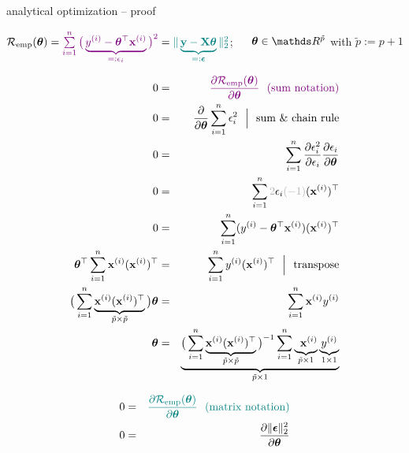 \documentclass[11pt,compress,t,notes=noshow, xcolor=table]{beamer}
\begin{document}
\begin{vbframe}{analytical optimization -- proof}

\scriptsize
$\mathcal{R}_{\text{emp}}(\bm{\theta}) = \textcolor{violet}{\sum\limits_{i=1}^n \big(\underbrace{y^{(i)} - \bm{\theta}^\top \mathbf{x}^{(i)}}_{=:
\epsilon_i} \big)^2}
= \textcolor{teal}{\| \underbrace{\mathbf{y} - \mathbf{X} \bm{\theta}}_{=: \bm{\epsilon}} 
\|^2_2}$; ~~ $\thetab \in \R^{\tilde p}$ with $\tilde p := p + 1$


\begin{minipage}[t]{0.52\textwidth}
    \tiny 
    \begin{eqnarray*}
        0 &=& \textcolor{violet}{\frac{\partial \risket}{\partial \thetab}
        ~~ \text{(sum notation)}} \\
        0 &=& \frac{\partial}{\partial \thetab} \sumin \epsilon_i^2 
        ~~ \Big \rvert
        ~~ \text{sum \& chain rule} \\
        0 &=& \sumin \frac{\partial \epsilon_i^2}{\partial \epsilon_i}
        \frac{\partial \epsilon_i}{\partial \thetab} \\
        0 &=& \sumin \textcolor{black!30}{2} \epsilon_i 
        \textcolor{black!30}{(-1)} (\xi)^\top \\ 
        0 &=& \sumin (\yi - \thetab^\top \xi)(\xi)^\top \\
        \thetab^\top \sumin  \xi (\xi)^\top &=&\sumin \yi (\xi)^\top 
        ~~ \Big \rvert ~~ \text{transpose} \\
        \big( \sumin \underbrace{\xi (\xi)^\top }_{\tilde p \times \tilde p}\big) \thetab &=& 
        \sumin \xi \yi \\
        \thetab &=&  \underbrace{\big(\sumin
        \underbrace{\xi (\xi)^\top}_{\tilde p \times \tilde p}  \big)^{-1} \sumin
        \underbrace{\phantom{y}\xi}_{\tilde p \times 1} \underbrace{\yi}_
        {1 \times 1}}_{\tilde p \times 1}
    \end{eqnarray*}
\end{minipage}
\hfill
\begin{minipage}[t]{0.45\textwidth}
    \tiny 
    \begin{eqnarray*}
        0 &=& \textcolor{teal}{\frac{\partial \risket}{\partial \thetab}
        ~~ \text{(matrix notation)}} \\
        0 &=& \frac{\partial \| \bm{\epsilon} \|_2^2 }{\partial \thetab} \\

\end{eqnarray*}
\end{minipage}
\end{vbframe}
\end{document}
